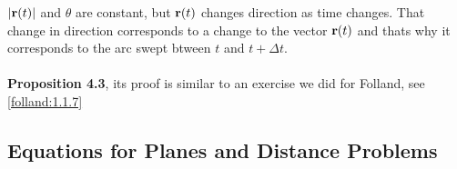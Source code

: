 $|\boldsymbol{\mathbf{r}}(t)|$ and $\theta$ are constant, but $\boldsymbol{\mathbf{r}}(t)$ changes direction as time changes.
That change in direction corresponds to a change to the vector $\boldsymbol{\mathbf{r}}(t)$ and thats
why it corresponds to the arc swept btween $t$ and $t+ \Delta t$.
\\~\\

\textbf{Proposition 4.3}, its proof is similar to an exercise we did for Folland, see
\ref{folland:1.1.7}


\subsection{Equations for Planes and Distance Problems}